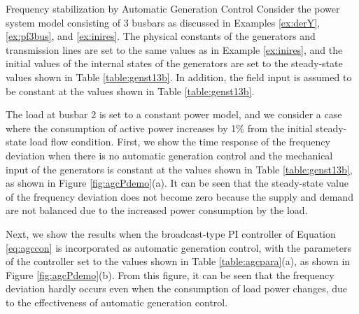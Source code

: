\documentclass[graybox, envcountchap]{svmult}
\begin{document}
\begin{example}{Frequency stabilization by Automatic Generation Control}\label{ex:agcdemo}
Consider the power system model consisting of 3 busbars as discussed in Examples
\ref{ex:derY}, \ref{ex:pf3bus}, and \ref{ex:inires}. The physical constants of
the generators and transmission lines are set to the same values as in Example
\ref{ex:inires}, and the initial values of the internal states of the generators
are set to the steady-state values shown in Table \ref{table:genst13b}. In
addition, the field input is assumed to be constant at the values shown in Table
\ref{table:genst13b}.

The load at busbar 2 is set to a constant power model, and we consider a case
where the consumption of active power increases by 1\% from the initial
steady-state load flow condition. First, we show the time response of the
frequency deviation when there is no automatic generation control and the
mechanical input of the generators is constant at the values shown in Table
\ref{table:genst13b}, as shown in Figure \ref{fig:agcPdemo}(a). It can be seen
that the steady-state value of the frequency deviation does not become zero
because the supply and demand are not balanced due to the increased power
consumption by the load.

Next, we show the results when the broadcast-type PI controller of Equation
\ref{eq:agccon} is incorporated as automatic generation control, with the
parameters of the controller set to the values shown in Table
\ref{table:agcpara}(a), as shown in Figure \ref{fig:agcPdemo}(b). From this
figure, it can be seen that the frequency deviation hardly occurs even when the
consumption of load power changes, due to the effectiveness of automatic
generation control.
\end{example}
\end{document}
